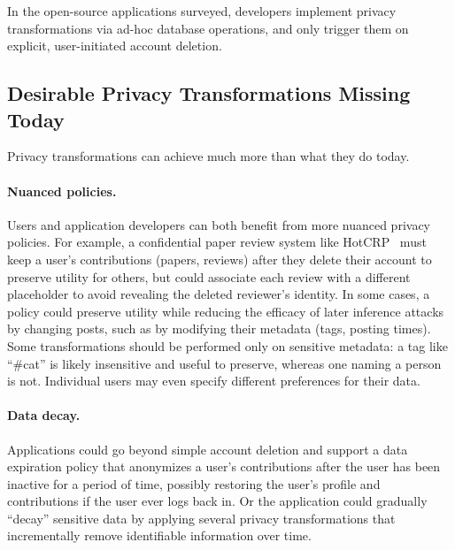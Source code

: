 In the open-source applications surveyed, developers implement privacy transformations
via ad-hoc database operations, and only trigger them on explicit, user-initiated account
deletion.
%
%

\subsection{Desirable Privacy Transformations Missing Today}
Privacy transformations can achieve much more than what they do today.

\paragraph{Nuanced policies.}
%
Users and application developers can both benefit from more nuanced privacy policies.
%
For example, a confidential paper review system like HotCRP~\cite{hotcrp} must keep a
user's contributions
(papers, reviews) after they delete their account to preserve utility for others, but could
associate each review with a different placeholder to avoid revealing the deleted reviewer's
identity.
%
In some cases, a policy could preserve utility while reducing the efficacy of later inference
attacks by changing posts, such as by modifying their metadata (\eg tags, posting times).
%
Some transformations should be performed only on sensitive metadata:
a tag like “\#cat” is likely insensitive and useful to preserve, whereas one naming a person is not.
%
%
Individual users may even specify different preferences for their data.
%
%

\paragraph{Data decay.}
%
Applications could go beyond simple account deletion and support a data expiration policy that
anonymizes a user's contributions after the user has been inactive for a period of time,
possibly restoring the user's profile and contributions if the user ever logs back in.
%
Or the application could gradually ``decay'' sensitive data by applying several privacy
transformations that incrementally remove identifiable information over time.
%

